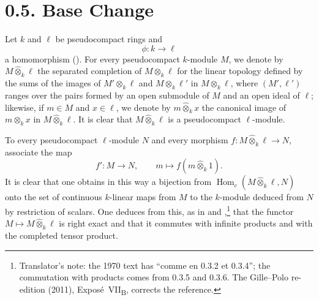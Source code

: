 
\section*{0.5. Base Change}
\label{sga3:VIIB:0.5}

Let \(k\) and \(\ell\) be pseudocompact rings and
\[
  \phi:k\longrightarrow\ell
\]
a homomorphism (). For every pseudocompact \(k\)-module
\(M\), we denote by \(M\widehat{\otimes}_k\ell\) the separated completion
of \(M\otimes_k\ell\) for the linear topology defined by the sums of the
images of \(M'\otimes_k\ell\) and \(M\otimes_k\ell'\) in
\(M\otimes_k\ell\), where \((M',\ell')\) ranges over the pairs formed by
an open submodule of \(M\) and an open ideal of \(\ell\); likewise, if
\(m\in M\) and \(x\in\ell\), we denote by \(m\widehat{\otimes}_kx\) the
canonical image of \(m\otimes_kx\) in \(M\widehat{\otimes}_k\ell\). It is
clear that \(M\widehat{\otimes}_k\ell\) is a pseudocompact
\(\ell\)-module.

To every pseudocompact \(\ell\)-module \(N\) and every morphism
\(f:M\widehat{\otimes}_k\ell\to N\), associate the map
\[
  f':M\longrightarrow N,
  \qquad
  m\longmapsto f(m\widehat{\otimes}_k1).
\]
It is clear that one obtains in this way a bijection from
\(\operatorname{Hom}_c(M\widehat{\otimes}_k\ell,N)\) onto the set of
continuous \(k\)-linear maps from \(M\) to the \(k\)-module deduced from
\(N\) by restriction of scalars. One deduces from this, as in
 and ,\footnote{Translator's note: the 1970 text has ``comme en 0.3.2
et 0.3.4''; the commutation with products comes from 0.3.5 and 0.3.6. The Gille--Polo re-edition (2011),
Expos\'e~VII\textsubscript{B}, corrects the reference.} that the functor
\(M\mapsto M\widehat{\otimes}_k\ell\) is right exact and that it commutes
with infinite products and with the completed tensor product.


